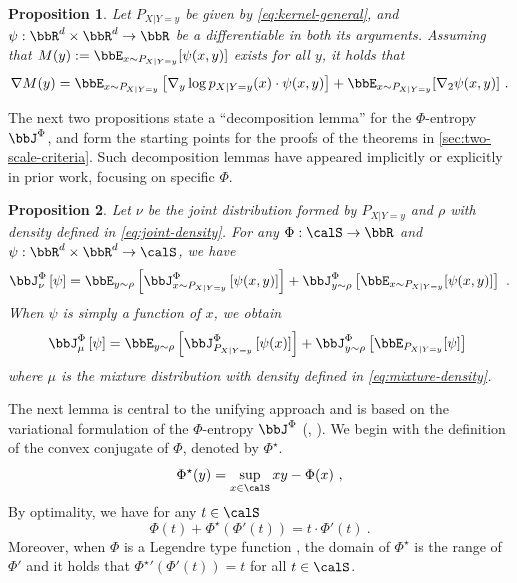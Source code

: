\documentclass[11pt]{article}
\newtheorem{proposition}{Proposition}[section]
\newcounter{ct}
\newcommand{\Phient}[3]{
    \ensuremath{\if$#3$\bbJ_{#1}^{#2}\else\bbJ_{#1}^{#2}\left[#3\right]\fi}}
\begin{document}
\begin{proposition}
\label{prop:expected-value-kernel-test-grad}
Let \(P_{X | Y = y}\) be given by \cref{eq:kernel-general}, and \(\psi : \bbR^{d} \times \bbR^{d} \to \bbR\) be a differentiable in both its arguments.
Assuming that \(M(y) := \bbE_{x \sim P_{X | Y = y}}[\psi(x, y)]\) exists for all \(y\), it holds that
\begin{equation*}
    \nabla M(y) = \bbE_{x \sim P_{X | Y = y}}\left[\nabla_{y}\log p_{X | Y= y}(x) \cdot \psi(x, y)\right] + \bbE_{x \sim P_{X | Y = y}}[\nabla_{2}\psi(x, y)]~.
\end{equation*}
\end{proposition}

The next two propositions state a ``decomposition lemma'' for the \(\Phi\)-entropy \(\bbJ^{\Phi}\), and form the starting points for the proofs of the theorems in \cref{sec:two-scale-criteria}.
Such decomposition lemmas have appeared implicitly or explicitly in prior work, focusing on specific \(\Phi\).

\begin{proposition}
\label{prop:decomp-phient}
Let \(\nu\) be the joint distribution formed by \(P_{X | Y = y}\) and \(\rho\) with density defined in \cref{eq:joint-density}.
For any \(\Phi : \calS \to \bbR\) and \(\psi : \bbR^{d} \times \bbR^{d} \to \calS\), we have
\begin{equation*}
    \Phient{\nu}{\Phi}{\psi} = \bbE_{y \sim \rho}\left[\Phient{x \sim P_{X | Y = y}}{\Phi}{\psi(x, y)}\right] + \Phient{y \sim \rho}{\Phi}{\bbE_{x \sim P_{X | Y = y}}[\psi(x, y)]}~.
\end{equation*}
When \(\psi\) is simply a function of \(x\), we obtain
\begin{equation*}
    \Phient{\mu}{\Phi}{\psi} = \bbE_{y \sim \rho}\left[\Phient{P_{X | Y = y}}{\Phi}{\psi(x)}\right] + \Phient{y \sim \rho}{\Phi}{\bbE_{P_{X | Y = y}}[\psi]}~
\end{equation*}
where \(\mu\) is the mixture distribution with density defined in \cref{eq:mixture-density}.
\end{proposition}

The next lemma is central to the unifying approach and is based on the variational formulation of the \(\Phi\)-entropy \(\bbJ^{\Phi}\) (\citet[Prop. 4]{chafai2004entropies}, \citet[Lem. 1]{boucheron2005moment}).
We begin with the definition of the convex conjugate of \(\Phi\), denoted by \(\Phi^{\star}\).
\begin{equation*}
    \Phi^{\star}(y) = \sup_{x \in \calS} xy - \Phi(x)~,
\end{equation*}
By optimality, we have for any \(t \in \calS\)
\begin{equation}
\label{eq:conv-conj-identity}
    \Phi(t) + \Phi^{\star}(\Phi'(t)) = t \cdot \Phi'(t)~.
\end{equation}
Moreover, when \(\Phi\) is a Legendre type function \citep[Chap. 26]{rockafellar1997convex}, the domain of \(\Phi^{\star}\) is the range of \(\Phi'\) and it holds that \({\Phi^{\star}}'(\Phi'(t)) = t\) for all \(t \in \calS\).
\end{document}
